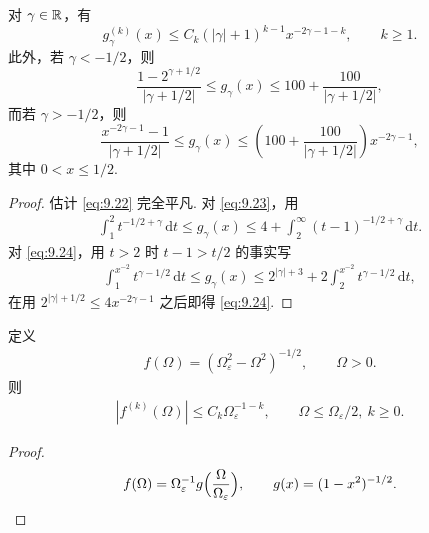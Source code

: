 \begin{lemma}\label{lem:9.12}
对 $\gamma \in \mathbb{R}$，有
\begin{equation}\label{eq:9.22}
  g_{\gamma}^{(k)}(x)\leq C_{k}(|\gamma|+1)^{k-1}x^{-2\gamma-1-k},\qquad k\geq 1.
\end{equation}
此外，若 $\gamma < -1/2$，则
\begin{equation}\label{eq:9.23}
  \frac{1-2^{\gamma+1/2}}{|\gamma+1/2|}\leq g_{\gamma}(x)\leq 100+\frac{100}{|\gamma+1/2|},
\end{equation}
而若 $\gamma > -1/2$，则
\begin{equation}\label{eq:9.24}
  \frac{x^{-2\gamma-1}-1}{|\gamma+1/2|}\leq g_{\gamma}(x)
  \leq\left(100+\frac{100}{|\gamma+1/2|}\right)x^{-2\gamma-1},
\end{equation}
其中 $0 < x \leq 1/2$.
\end{lemma}

\begin{proof}
估计 \eqref{eq:9.22} 完全平凡. 对 \eqref{eq:9.23}，用
\begin{align*}
  \int_{1}^{2}t^{-1/2+\gamma}\,\mathrm{d}t\leq g_{\gamma}(x)
  \leq 4+\int_{2}^{\infty}(t-1)^{-1/2+\gamma}\,\mathrm{d}t.
\end{align*}
对 \eqref{eq:9.24}，用 $t > 2$ 时 $t-1 > t/2$ 的事实写
\begin{align*}
  \int_{1}^{x^{-2}}t^{\gamma-1/2}\,\mathrm{d}t\leq g_{\gamma}(x)
  \leq 2^{|\gamma|+3}+2\int_{2}^{x^{-2}}t^{\gamma-1/2}\,\mathrm{d}t,
\end{align*}
在用 $2^{|\gamma|+1/2} \leq 4x^{-2\gamma-1}$ 之后即得 \eqref{eq:9.24}.
\end{proof}

\begin{lemma}\label{lem:9.13}
定义
\begin{align*}
  f(\Omega)=(\Omega_{\varepsilon}^{2}-\Omega^{2})^{-1/2},\qquad \Omega>0.
\end{align*}
则
\begin{align*}
  |f^{(k)}(\Omega)|\leq C_{k}\Omega_{\varepsilon}^{-1-k},\qquad \Omega\leq\Omega_{\varepsilon}/2,\ k\geq 0.
\end{align*}
\end{lemma}

\begin{proof}
\begin{align*}
  f(\Omega)=\Omega_{\varepsilon}^{-1}g\Bigl(\frac{\Omega}{\Omega_{\varepsilon}}\Bigr),
  \qquad g(x)=(1-x^{2})^{-1/2}.
\end{align*}
\end{proof}

